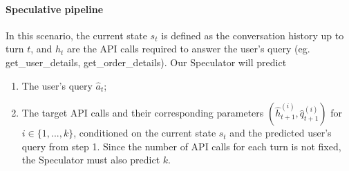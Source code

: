 \paragraph{Speculative pipeline} 
In this scenario, the current state $s_t$ is defined as the conversation history up to turn $t$, and $h_t$ are the API calls required to answer the user's query (eg. get\_user\_details, get\_order\_details). Our Speculator will predict
\begin{enumerate}
    \item The user’s query $\hat{a}_t$;
    \item The target API calls and their corresponding parameters $(\hat{h}_{t+1}^{(i)}, \hat{q}_{t+1}^{(i)})$ for $i \in \{1, ..., k\}$, conditioned on the current state $s_t$ and the predicted user's query from step 1. Since the number of API calls for each turn is not fixed, the Speculator must also predict $k$.
\end{enumerate}
\vspace{-5pt}

